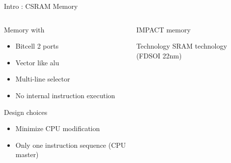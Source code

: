 %
\begin{Frame}{Intro : CSRAM Memory}
  \begin{columns}[t]
    \begin{column}{\BW} %
      \begin{block}{Memory with}
        \begin{itemize}
        \item Bitcell 2 ports
        \item Vector like alu
        \item Multi-line selector
        \item No internal instruction execution
        \end{itemize}
      \end{block} 
      \begin{alertblock}{Design choices}
        \begin{itemize}
        \item Minimize CPU modification
        \item Only one instruction sequence (CPU master)
        \end{itemize}
      \end{alertblock} 
    \end{column}
    
    \begin{column}{\BW} %
      \begin{block}{IMPACT memory}
      \end{block}   
      \begin{block}{Technology}
        SRAM technology (FDSOI 22nm)
      \end{block}   
    \end{column}
  \end{columns}  
\end{Frame}


